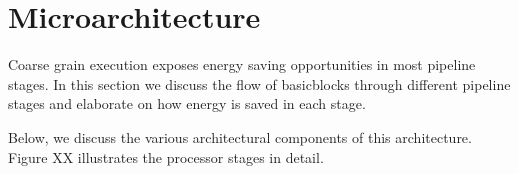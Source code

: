 \section{Microarchitecture}
\label{sec:arch}

Coarse grain execution exposes energy saving opportunities in most pipeline
stages. In this section we discuss the flow of basicblocks through different
pipeline stages and elaborate on how energy is saved in each stage.

Below, we discuss the various architectural components of this architecture.
Figure XX illustrates the processor stages in detail.






